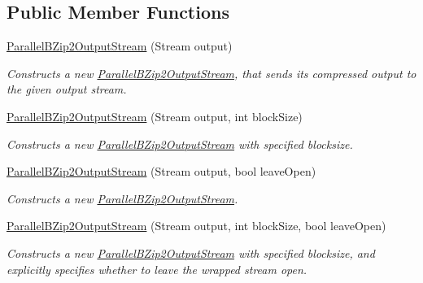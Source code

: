 \subsection*{Public Member Functions}
\begin{DoxyCompactItemize}
\item 
\mbox{\hyperlink{class_super_tiled2_unity_1_1_ionic_1_1_b_zip2_1_1_parallel_b_zip2_output_stream_aa371304363b2690c38f3afb52a3f64f1}{Parallel\+B\+Zip2\+Output\+Stream}} (Stream output)
\begin{DoxyCompactList}\small\item\em Constructs a new {\ttfamily \mbox{\hyperlink{class_super_tiled2_unity_1_1_ionic_1_1_b_zip2_1_1_parallel_b_zip2_output_stream}{Parallel\+B\+Zip2\+Output\+Stream}}}, that sends its compressed output to the given output stream. \end{DoxyCompactList}\item 
\mbox{\hyperlink{class_super_tiled2_unity_1_1_ionic_1_1_b_zip2_1_1_parallel_b_zip2_output_stream_a412bd13c8f723e74dfcabeecd06ca7fc}{Parallel\+B\+Zip2\+Output\+Stream}} (Stream output, int block\+Size)
\begin{DoxyCompactList}\small\item\em Constructs a new {\ttfamily \mbox{\hyperlink{class_super_tiled2_unity_1_1_ionic_1_1_b_zip2_1_1_parallel_b_zip2_output_stream}{Parallel\+B\+Zip2\+Output\+Stream}}} with specified blocksize. \end{DoxyCompactList}\item 
\mbox{\hyperlink{class_super_tiled2_unity_1_1_ionic_1_1_b_zip2_1_1_parallel_b_zip2_output_stream_abb0fdad0631c15f32ee5a324d667628d}{Parallel\+B\+Zip2\+Output\+Stream}} (Stream output, bool leave\+Open)
\begin{DoxyCompactList}\small\item\em Constructs a new {\ttfamily \mbox{\hyperlink{class_super_tiled2_unity_1_1_ionic_1_1_b_zip2_1_1_parallel_b_zip2_output_stream}{Parallel\+B\+Zip2\+Output\+Stream}}}. \end{DoxyCompactList}\item 
\mbox{\hyperlink{class_super_tiled2_unity_1_1_ionic_1_1_b_zip2_1_1_parallel_b_zip2_output_stream_aee17545c8067d1b5eb3e2590e9c58f1f}{Parallel\+B\+Zip2\+Output\+Stream}} (Stream output, int block\+Size, bool leave\+Open)
\begin{DoxyCompactList}\small\item\em Constructs a new {\ttfamily \mbox{\hyperlink{class_super_tiled2_unity_1_1_ionic_1_1_b_zip2_1_1_parallel_b_zip2_output_stream}{Parallel\+B\+Zip2\+Output\+Stream}}} with specified blocksize, and explicitly specifies whether to leave the wrapped stream open. \end{DoxyCompactList}\item 

\end{DoxyCompactItemize}
